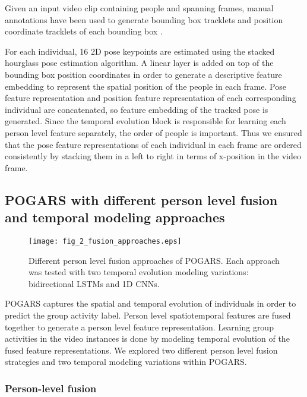\documentclass[a4paper,fleqn]{cas-dc}
\begin{document}
Given an input video clip \textit{} containing \textit{} people and spanning \textit{} frames,
manual annotations have been used to generate \textit{} bounding box tracklets \textit{} and position coordinate tracklets of each bounding box \textit{}.

For each individual, 16 2D pose keypoints \textit{} are estimated using the stacked hourglass pose estimation algorithm.
A linear layer is added on top of the bounding box position coordinates  in order to generate a descriptive feature embedding \textit{} to represent the spatial position of the people in each frame.
Pose feature representation  and position feature representation  of each corresponding individual are concatenated, so \textit{} feature embedding of the tracked pose is generated.
Since the temporal evolution block is responsible for learning each person level feature separately, the order of people is important. 
Thus we ensured that the pose feature representations of each individual in each frame are ordered consistently by stacking them in a left to right in terms of x-position in the video frame.

\subsection{POGARS with different person level fusion and temporal modeling  approaches}
\label{ssec:fusion-approaches}

\begin{figure}[pos=t]
  \centering
  \texttt{[image: fig\_2\_fusion\_approaches.eps]}
  \caption{Different person level fusion approaches of POGARS. Each approach was tested with two temporal evolution modeling variations: bidirectional LSTMs and 1D CNNs.}
  \label{fig:fusion-approaches}
\end{figure}

POGARS captures the spatial and temporal evolution of  individuals in order to predict the group activity label. 
Person level spatiotemporal features are fused together to generate a person level feature representation. 
Learning group activities in the video instances is done by modeling temporal evolution of the fused feature representations.  
We explored two different person level fusion strategies and two temporal modeling variations within POGARS.


\subsubsection{Person-level fusion}
\label{sssec:person-level-fusion}
\end{document}
